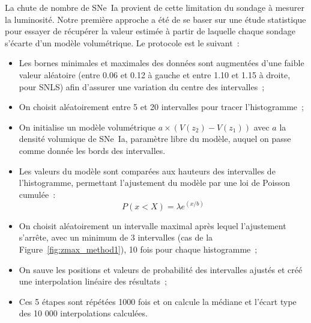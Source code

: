 \documentclass[../main/main.tex]{subfiles}
\begin{document}
La chute de nombre de SNe~Ia provient de cette limitation du sondage à mesurer
la luminosité. Notre première approche a été de se baser sur une étude
statistique pour essayer de récupérer la valeur estimée à partir de laquelle
chaque sondage s'écarte d'un modèle volumétrique. Le protocole est le suivant~:
\begin{itemize}
    \item Les bornes minimales et maximales des données sont augmentées d'une
        faible valeur aléatoire (entre 0.06 et 0.12 à gauche et entre 1.10 et
        1.15 à droite, pour SNLS) afin d'assurer une variation du centre des
        intervalles~;
    \item On choisit aléatoirement entre 5 et 20 intervalles pour tracer
        l'histogramme~;
    \item On initialise un modèle volumétrique $a\times
        \left(V(z_2)-V(z_1)\right)$ avec $a$ la densité volumique de SNe~Ia,
        paramètre libre du modèle, auquel on passe comme donnée les bords des
        intervalles.
    \item Les valeurs du modèle sont comparées aux hauteurs des
        intervalles de l'histogramme, permettant l'ajustement du modèle par une
        loi de Poisson cumulée~:
        \begin{equation}\label{eq:poisson}
            P(x<X) = \lambda e^(x/b)
        \end{equation}
    \item On choisit aléatoirement un intervalle maximal après lequel
        l'ajustement s'arrête, avec un minimum de 3 intervalles (cas de la
        Figure~\ref{fig:zmax_method1}), 10 fois pour chaque histogramme~;
    \item On sauve les positions et valeurs de probabilité des intervalles
        ajustés et créé une interpolation linéaire des résultats~;
    \item Ces 5 étapes sont répétées 1000 fois et on calcule la médiane et
        l'écart type des 10 000 interpolations calculées.
\end{itemize}

\end{document}
